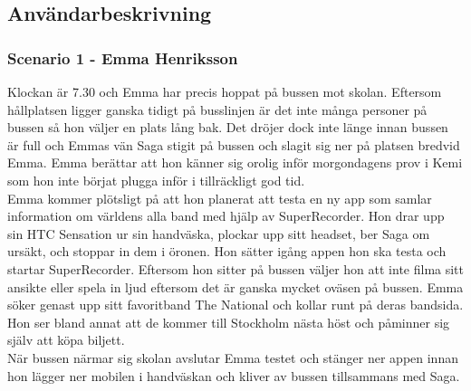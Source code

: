 \subsection{Användarbeskrivning}
\subsubsection{Scenario 1 - Emma Henriksson}
Klockan är 7.30 och Emma har precis hoppat på bussen mot skolan. Eftersom hållplatsen ligger ganska tidigt på busslinjen är det inte många personer på bussen så hon väljer en plats lång bak. Det dröjer dock inte länge innan bussen är full och Emmas vän Saga stigit på bussen och slagit sig ner på platsen bredvid Emma. Emma berättar att hon känner sig orolig inför morgondagens prov i Kemi som hon inte börjat plugga inför i tillräckligt god tid.\\

Emma kommer plötsligt på att hon planerat att testa en ny app som samlar information om världens alla band med hjälp av SuperRecorder. Hon drar upp sin HTC Sensation ur sin handväska, plockar upp sitt headset, ber Saga om ursäkt, och stoppar in dem i öronen. Hon sätter igång appen hon ska testa och startar SuperRecorder. Eftersom hon sitter på bussen väljer hon att inte filma sitt ansikte eller spela in ljud eftersom det är ganska mycket oväsen på bussen. Emma söker genast upp sitt favoritband The National och kollar runt på deras bandsida. Hon ser bland annat att de kommer till Stockholm nästa höst och påminner sig själv att köpa biljett.\\

När bussen närmar sig skolan avslutar Emma testet och stänger ner appen innan hon lägger ner mobilen i handväskan och kliver av bussen tillsammans med Saga.
